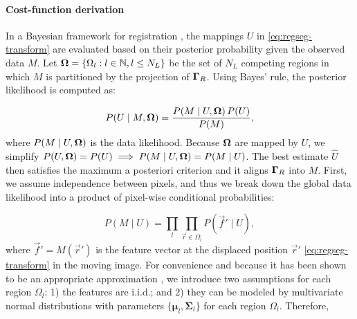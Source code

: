\paragraph*{Cost-function derivation}
In a Bayesian framework for registration \citep{wyatt_map_2003,pohl_bayesian_2006,gass_simultaneous_2014},
  the mappings $U$ in \eqref{eq:regseg-transform} are
  evaluated based on their posterior probability given the observed data
  $M$.
Let $\boldsymbol{\Omega} = \{\Omega_l: l \in \mathbb{N}, l \leq N_L\}$ be the set of $N_L$ competing regions in
  which $M$ is partitioned by the projection of $\boldsymbol{\Gamma}_R$.
Using Bayes' rule, the posterior likelihood is computed as:

  \begin{equation}
  P(U \mid M, \boldsymbol{\Omega} ) = \frac{P(M \mid U,\boldsymbol{\Omega} )\, P(U)}{P(M)},
  \label{eq:regseg-bayes_rule}
  \end{equation}
  where $P(M \mid U,\boldsymbol{\Omega})$ is the data likelihood.
Because $\boldsymbol{\Omega}$ are mapped by $U$, we simplify
  $P(U, \boldsymbol{\Omega}) = P(U) \implies P(M \mid U,\boldsymbol{\Omega}) = P(M \mid U)$.
The best estimate $\hat{U}$ then satisfies the maximum a posteriori criterion
  and it aligns $\boldsymbol{\Gamma}_R$ into $M$.
First, we assume independence between pixels, and thus we break down the
  global data likelihood into a product of pixel-wise conditional probabilities:

  \begin{equation}
  P(M \mid U) = \underset{l}{\prod} \underset{\vec{r}\in \Omega_l}{\prod}
    P\left( \vec{f}' \mid U \right),
  \label{eq:regseg-bayes_aposteriori}
  \end{equation}
  where $\vec{f}' = M(\vec{r}')$ is the feature vector at the displaced
  position $\vec{r}'$ \eqref{eq:regseg-transform} in the moving image.
For convenience and because it has been shown to be an appropriate approximation
  \citep{leemput_automated_1999,cuadra_comparison_2005}, we introduce two assumptions for each
  region $\Omega_l$:
  1) the features are i.i.d.; and 2) they can be modeled by multivariate normal
  distributions \citep{esteban_mbis_2014} with parameters
  $\lbrace \boldsymbol{\mu}_l, \boldsymbol{\Sigma}_{l} \rbrace$
  for each region $\Omega_l$.
 Therefore,

